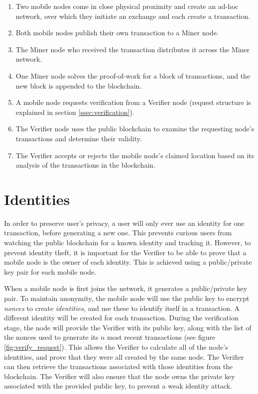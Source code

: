 \begin{enumerate}[label=\textbf{\arabic*}.]
\item Two mobile nodes come in close physical proximity and create an ad-hoc network, over which they initiate an exchange and each create a transaction.
\item Both mobile nodes publish their own transaction to a Miner node.
\item The Miner node who received the transaction distributes it across the Miner network.
\item One Miner node solves the proof-of-work for a block of transactions, and the new block is appended to the blockchain.
\item A mobile node requests verification from a Verifier node (request structure is explained in section \ref{ssec:verification}).
\item The Verifier node uses the public blockchain to examine the requesting node's transactions and determine their validity.
\item The Verifier accepts or rejects the  mobile node's claimed location based on its analysis of the transactions in the blockchain. 
\end{enumerate}

\section{Identities}
In order to preserve user's privacy, a user will only ever use an identity for one transaction, before generating a new one. This prevents curious users from watching the public blockchain for a known identity and tracking it. However, to prevent identity theft, it is important for the Verifier to be able to prove that a mobile node is the owner of each identity. This is achieved using a public/private key pair for each mobile node.

When a mobile node is first joins the network, it generates a public/private key pair. To maintain anonymity, the mobile node will use the public key to encrypt \textit{nonces} to create \textit{identities}, and use these to identify itself in a transaction. A different identity will be created for each transaction. During the verification stage, the node will provide the Verifier with its public key, along with the list of the nonces used to generate its $n$ most recent transactions (see figure \ref{fig:verify_request}). This allows the Verifier to calculate all of the node's identities, and prove that they were all created by the same node. The Verifier can then retrieve the transactions associated with those identities from the blockchain. The Verifier will also ensure that the node owns the private key associated with the provided public key, to prevent a weak identity attack.

